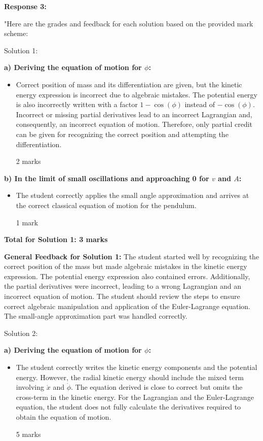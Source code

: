 \documentclass[a4paper,11pt]{article}
\begin{document}
\textbf{Response 3:}

"Here are the grades and feedback for each solution based on the provided mark scheme:

Solution 1:

\textbf{a) Deriving the equation of motion for \( \phi \):}
\begin{itemize}
    \item Correct position of mass and its differentiation are given, but the kinetic energy expression is incorrect due to algebraic mistakes. The potential energy is also incorrectly written with a factor \(1 - \cos(\phi)\) instead of \(-\cos(\phi)\). Incorrect or missing partial derivatives lead to an incorrect Lagrangian and, consequently, an incorrect equation of motion. Therefore, only partial credit can be given for recognizing the correct position and attempting the differentiation.
    \item[2 marks]
\end{itemize}

\textbf{b) In the limit of small oscillations and approaching 0 for \( v \) and \( A \):}
\begin{itemize}
    \item The student correctly applies the small angle approximation and arrives at the correct classical equation of motion for the pendulum.
    \item[1 mark]
\end{itemize}

\textbf{Total for Solution 1: 3 marks}

\textbf{General Feedback for Solution 1:}
The student started well by recognizing the correct position of the mass but made algebraic mistakes in the kinetic energy expression. The potential energy expression also contained errors. Additionally, the partial derivatives were incorrect, leading to a wrong Lagrangian and an incorrect equation of motion. The student should review the steps to ensure correct algebraic manipulation and application of the Euler-Lagrange equation. The small-angle approximation part was handled correctly.

Solution 2:

\textbf{a) Deriving the equation of motion for \( \phi \):}
\begin{itemize}
    \item The student correctly writes the kinetic energy components and the potential energy. However, the radial kinetic energy should include the mixed term involving \( \dot{x} \) and \( \dot{\phi} \). The equation derived is close to correct but omits the cross-term in the kinetic energy. For the Lagrangian and the Euler-Lagrange equation, the student does not fully calculate the derivatives required to obtain the equation of motion.
    \item[5 marks]
\end{itemize}
\end{document}
